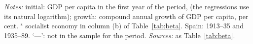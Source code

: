 \vspace{-1.2em}\noindent\begin{minipage}{\textwidth}\footnotesize \textit{Notes:} initial: GDP per capita in the first year of the period, \intlnineteen{} (the regressions use its natural logarithm); growth: compound annual growth of GDP per capita, per cent. $^{\mathrm{s}}$ socialist economy in column (b) of Table~\ref{tab:beta}. Spain: 1913--35 and 1935--89. `---': not in the sample for the period. \textit{Sources:} as Table~\ref{tab:beta}.\end{minipage}\vspace{1em}
